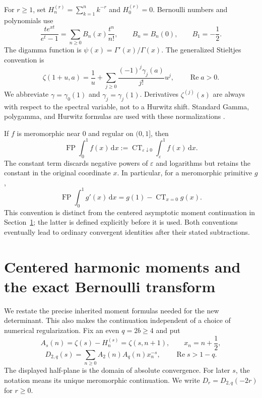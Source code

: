 \documentclass[11pt,a4paper]{article}
\numberwithin{equation}{section}
\theoremstyle{plain}
\theoremstyle{definition}
\theoremstyle{remark}
\DeclareMathOperator{\CT}{CT}
\DeclareMathOperator{\FP}{FP}
\newcommand{\dd}{\,\mathrm d}
\newcommand{\eps}{\varepsilon}
\newcommand{\re}{\operatorname{Re}}
\begin{document}
For $r\ge1$, set $H_n^{(r)}=\sum_{k=1}^n k^{-r}$ and
$H_0^{(r)}=0$. Bernoulli numbers and polynomials use
\[
 \frac{te^{xt}}{e^t-1}=\sum_{n\ge0}B_n(x)\frac{t^n}{n!},
 \qquad B_n=B_n(0),\qquad B_1=-\frac12.
\]
The digamma function is $\psi(x)=\Gamma'(x)/\Gamma(x)$.
The generalized Stieltjes convention is
\begin{equation}\label{eq:stieltjes-convention}
 \zeta(1+u,a)=\frac1u+
       \sum_{j\ge0}\frac{(-1)^j\gamma_j(a)}{j!}u^j,
 \qquad \re a>0.
\end{equation}
We abbreviate $\gamma=\gamma_0(1)$ and
$\gamma_j=\gamma_j(1)$. Derivatives $\zeta^{(j)}(s)$ are always
with respect to the spectral variable, not to a Hurwitz shift.
Standard Gamma, polygamma, and Hurwitz formulas are used with these
normalizations \cite{DLMF}.

If $f$ is meromorphic near $0$ and regular on $(0,1]$, then
\begin{equation}\label{eq:fp-convention}
 \FP\int_0^1 f(x)\dd x
 :=\CT_{\eps\downarrow0}\int_{\eps}^1 f(x)\dd x.
\end{equation}
The constant term discards negative powers of $\eps$ and logarithms
but retains the constant in the original coordinate $x$.
In particular, for a meromorphic primitive $g$,
\begin{equation}\label{eq:endpoint-law-intro}
 \FP\int_0^1 g'(x)\dd x=g(1)-\CT_{x=0}g(x).
\end{equation}
This convention is distinct from the centered asymptotic moment
continuation in Section~\ref{sec:tail-foundation}; the latter is
defined explicitly before it is used. Both conventions eventually
lead to ordinary convergent identities after their stated subtractions.



\section{Centered harmonic moments and the exact Bernoulli transform}
\label{sec:tail-foundation}

We restate the precise inherited moment formulas needed for the new
determinant. This also makes the continuation independent of a
choice of numerical regularization. Fix an even $q=2b\ge4$ and put
\[
 A_s(n)=\zeta(s)-H_n^{(s)}=\zeta(s,n+1),\qquad x_n=n+\frac12,
\]
\begin{equation}\label{eq:tail-Dirichlet}
 D_{2,q}(s)=\sum_{n\ge0} A_2(n)A_q(n)x_n^{-s},
 \qquad \re s>1-q.
\end{equation}
The displayed half-plane is the domain of absolute convergence.
For later $s$, the notation means its unique meromorphic continuation.
We write $D_r=D_{2,q}(-2r)$ for $r\ge0$.
\end{document}
